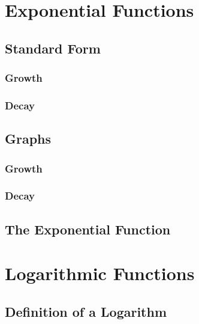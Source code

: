 \documentclass[]{book}
\begin{document}
\hypertarget{exponential-functions}{%
\section{Exponential Functions}\label{exponential-functions}}

\hypertarget{standard-form}{%
\subsection{Standard Form}\label{standard-form}}

\hypertarget{growth}{%
\subsubsection{Growth}\label{growth}}

\hypertarget{decay}{%
\subsubsection{Decay}\label{decay}}

\hypertarget{graphs}{%
\subsection{Graphs}\label{graphs}}

\hypertarget{growth-1}{%
\subsubsection{Growth}\label{growth-1}}

\hypertarget{decay-1}{%
\subsubsection{Decay}\label{decay-1}}

\hypertarget{the-exponential-function}{%
\subsection{The Exponential Function}\label{the-exponential-function}}

\hypertarget{logarithmic-functions}{%
\section{Logarithmic Functions}\label{logarithmic-functions}}

\hypertarget{definition-of-a-logarithm}{%
\subsection{Definition of a Logarithm}\label{definition-of-a-logarithm}}
\end{document}
